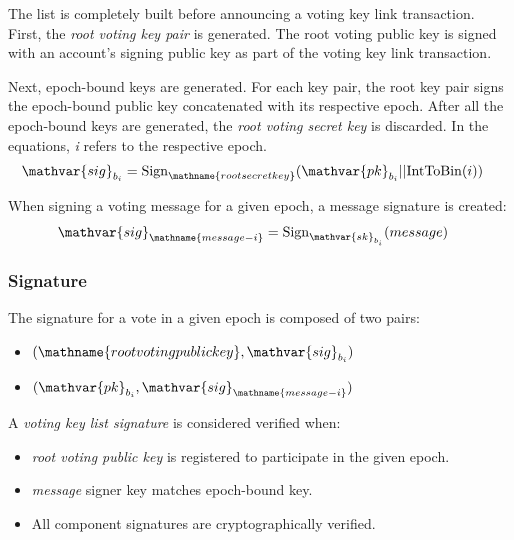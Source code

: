 The list is completely built before announcing a voting key link transaction.
First, the \emph{root voting key pair} is generated.
The root voting public key is signed with an account's signing public key as part of the voting key link transaction.

Next, epoch-bound keys are generated.
For each key pair, the root key pair signs the epoch-bound public key concatenated with its respective epoch.
After all the epoch-bound keys are generated, the \emph{root voting secret key} is discarded.
In the equations, \emph{i} refers to the respective epoch.
\begin{align*}
	\mathvar{sig}_{b_i} &= \mathfunc{Sign}_{\mathname{root secret key}}(\mathvar{pk}_{b_i} || \mathfunc{IntToBin}(i))
\end{align*}

When signing a voting message for a given epoch, a message signature is created:
\begin{align*}
	\mathvar{sig}_{\mathname{message-i}} &= \mathfunc{Sign}_{\mathvar{sk}_{b_{i}}}(message)
\end{align*}

\subsubsection{Signature}

The signature for a vote in a given epoch is composed of two pairs:
\begin{itemize}
	\item{$(\mathname{root voting public key}, \mathvar{sig}_{b_i} )$}
	\item{$(\mathvar{pk}_{b_{i}}, \mathvar{sig}_{\mathname{message-i}})$}
\end{itemize}

A \emph{voting key list signature} is considered verified when:
\begin{itemize}
	\item{\emph{root voting public key} is registered to participate in the given epoch.}
	\item{\emph{message} signer key matches epoch-bound key.}
	\item{All component signatures are cryptographically verified.}
\end{itemize}
